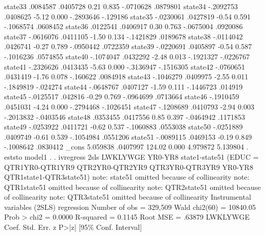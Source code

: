      state33 {\VBAR}   .0084587   .0405728     0.21   0.835    -.0710628    .0879801
     state34 {\VBAR}  -.2092753   .0408625    -5.12   0.000    -.2893646    -.129186
     state35 {\VBAR}  -.0230061   .0427819    -0.54   0.591    -.1068574    .0608452
     state36 {\VBAR}   .0122541   .0406917     0.30   0.763    -.0675004    .0920086
     state37 {\VBAR}  -.0616076   .0411105    -1.50   0.134    -.1421829    .0189678
     state38 {\VBAR}  -.0114042   .0426741    -0.27   0.789    -.0950442    .0722359
     state39 {\VBAR}  -.0220691   .0405897    -0.54   0.587    -.1016236    .0574855
     state40 {\VBAR}  -.1074047   .0432292    -2.48   0.013    -.1921327   -.0226767
     state41 {\VBAR}  -.2326626   .0413435    -5.63   0.000    -.3136947   -.1516305
     state42 {\VBAR}  -.0760651   .0431419    -1.76   0.078     -.160622    .0084918
     state43 {\VBAR}  -.1046279   .0409975    -2.55   0.011    -.1849819    -.024274
     state44 {\VBAR}  -.0648767   .0407127    -1.59   0.111    -.1446723     .014919
     state45 {\VBAR}  -.0125517    .042816    -0.29   0.769    -.0964699    .0713664
     state46 {\VBAR}  -.1910459   .0451031    -4.24   0.000    -.2794468   -.1026451
     state47 {\VBAR}  -.1208689   .0410793    -2.94   0.003    -.2013832   -.0403546
     state48 {\VBAR}   .0353455   .0417556     0.85   0.397    -.0464942    .1171853
     state49 {\VBAR}  -.0253922   .0411721    -0.62   0.537    -.1060883    .0553038
     state50 {\VBAR}  -.0251889   .0409749    -0.61   0.539    -.1054984    .0551206
     state51 {\VBAR}  -.0089115   .0469153    -0.19   0.849    -.1008642    .0830412
       _cons {\VBAR}   5.059838   .0407997   124.02   0.000     4.979872    5.139804
{\smallskip}
. eststo model1
{\smallskip}
. 
. ivregress 2sls LWKLYWGE YR0-YR8 state1-state51 (EDUC = QTR1YR0-QTR1YR9 QTR2YR0-QTR2YR9 QTR3YR0-QTR3YR9 YR0-YR8 QTR1state1-QTR3state51)
note: state51 omitted because of collinearity
note: QTR1state51 omitted because of collinearity
note: QTR2state51 omitted because of collinearity
note: QTR3state51 omitted because of collinearity
{\smallskip}
Instrumental variables (2SLS) regression          Number of obs   =    329,509
                                                  Wald chi2(60)   =   10840.05
                                                  Prob > chi2     =     0.0000
                                                  R-squared       =     0.1145
                                                  Root MSE        =     .63879
{\smallskip}
    LWKLYWGE {\VBAR}      Coef.   Std. Err.      z    P>|z|     [95\% Conf. Interval]
